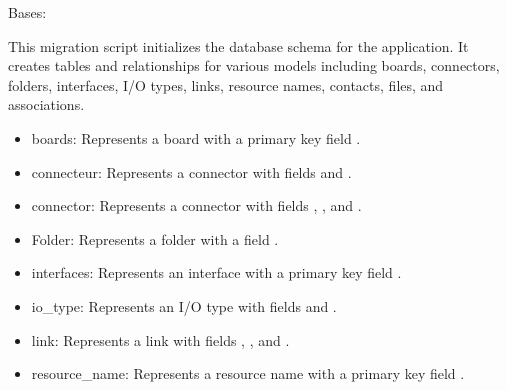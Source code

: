 \documentclass[letterpaper,10pt,english]{sphinxmanual}
\begin{document}
\begin{fulllineitems}
\label{\detokenize{app.migrations:app.migrations.0001_initial.Migration}}
\pysigstartsignatures
{}
\pysigstopsignatures
\sphinxAtStartPar
Bases: 

\sphinxAtStartPar
This migration script initializes the database schema for the application. 
It creates tables and relationships for various models including boards, 
connectors, folders, interfaces, I/O types, links, resource names, contacts, 
files, and associations.
\begin{description}
\begin{itemize}
\item {} 
\sphinxAtStartPar
boards: Represents a board with a primary key field .

\item {} 
\sphinxAtStartPar
connecteur: Represents a connector with fields  and .

\item {} 
\sphinxAtStartPar
connector: Represents a connector with fields , , and .

\item {} 
\sphinxAtStartPar
Folder: Represents a folder with a field .

\item {} 
\sphinxAtStartPar
interfaces: Represents an interface with a primary key field .

\item {} 
\sphinxAtStartPar
io\_type: Represents an I/O type with fields  and .

\item {} 
\sphinxAtStartPar
link: Represents a link with fields , , and .

\item {} 
\sphinxAtStartPar
resource\_name: Represents a resource name with a primary key field .


\end{itemize}
\end{description}
\end{fulllineitems}
\end{document}
